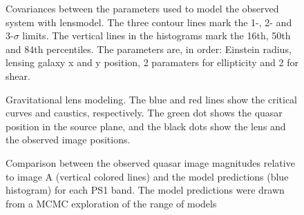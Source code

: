 \documentclass[manuscript]{aastex}
\begin{document}
\begin{figure}
\caption{
Covariances between the parameters used to model the observed system with lensmodel. The three contour lines mark the 1-, 2- and 3-$\sigma$ limits. The vertical lines in the histograms mark the 16th, 50th and 84th percentiles. The parameters are, in order: Einstein radius, lensing galaxy x and y position, 2 paramaters for ellipticity and 2 for shear.}
\label{mcmc_gravlens}
\end{figure}

\begin{figure}
\caption{
Gravitational lens modeling. The blue and red lines show the critical curves and caustics, respectively. The green dot shows the quasar position in the source plane, and the black dots show the lens and the observed image positions.}
\label{model}
\end{figure}



\begin{figure}
\caption{
Comparison between the observed quasar image magnitudes relative to image A (vertical colored lines) and the model predictions (blue histogram) for each PS1 band. The model predictions were drawn from a MCMC exploration of the range of models}
\label{modelphot}
\end{figure}
\end{document}
